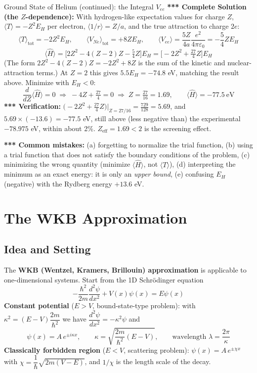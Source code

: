 \documentclass[11pt,a4paper]{article}
\begin{document}
\begin{prob}{Ground State of Helium (continued): the Integral $V_{ee}$}
\textbf{*** Complete Solution (the $Z$-dependence):} With hydrogen-like expectation values for charge $Z$, $\langle T\rangle = -Z^2E_H$ per electron, $\langle 1/r\rangle=Z/a$, and the true attraction to charge $2e$:
\[
\langle T\rangle_{\text{tot}} = -2Z^2E_H, \qquad \langle V_{Ne}\rangle_{\text{tot}} = +8ZE_H, \qquad \langle V_{ee}\rangle = \frac{5Z}{4a}\frac{e^2}{4\pi\varepsilon_0} = -\frac54ZE_H
\]
\[
\langle\hat H\rangle = \Big[2Z^2 - 4(Z-2)Z - \tfrac54Z\Big]E_H = \Big[-2Z^2+\tfrac{27}{4}Z\Big]E_H
\]
(The form $2Z^2-4(Z-2)Z=-2Z^2+8Z$ is the sum of the kinetic and nuclear-attraction terms.) At $Z=2$ this gives $5.5E_H=-74.8$ eV, matching the result above. Minimize with $E_H<0$:
\[
\frac{d}{dZ}\langle\hat H\rangle = 0 \;\Rightarrow\; -4Z+\tfrac{27}4=0 \;\Rightarrow\; \boxed{Z=\tfrac{27}{16}=1.69}, \qquad \boxed{\langle\hat H\rangle = -77.5\ \text{eV}}
\]
\textbf{*** Verification:} $\big(-2Z^2+\frac{27}4Z\big)\big|_{Z=27/16} = \frac{729}{128}=5.69$, and $5.69\times(-13.6)=-77.5$ eV, still above (less negative than) the experimental $-78.975$ eV, within about 2\%. $Z_{\text{eff}}=1.69<2$ is the screening effect.
\end{prob}

\textbf{*** Common mistakes:} (a) forgetting to normalize the trial function, (b) using a trial function that does not satisfy the boundary conditions of the problem, (c) minimizing the wrong quantity (minimize $\langle\hat H\rangle$, not $\langle T\rangle$), (d) interpreting the minimum as an exact energy: it is only an \textit{upper bound}, (e) confusing $E_H$ (negative) with the Rydberg energy $+13.6$ eV.

\section{The WKB Approximation}

\subsection{Idea and Setting}
The \textbf{WKB (Wentzel, Kramers, Brillouin) approximation} is applicable to one-dimensional systems. Start from the 1D Schr\"odinger equation
\[
-\frac{\hbar^2}{2m}\frac{d^2\psi}{dx^2} + V(x)\psi(x) = E\psi(x)
\]
\textbf{Constant potential} ($E>V$, bound-state-type problem): with $\kappa^2 = (E-V)\dfrac{2m}{\hbar^2}$ we have $\dfrac{d^2\psi}{dx^2} = -\kappa^2\psi$ and
\[
\psi(x) = A\,e^{\pm i\kappa x}, \qquad \kappa = \sqrt{\frac{2m}{\hbar^2}(E-V)}, \qquad \text{wavelength } \lambda = \frac{2\pi}{\kappa}
\]
\textbf{Classically forbidden region} ($E<V$, scattering problem): $\psi(x) = A\,e^{\pm\chi x}$ with $\chi = \dfrac1\hbar\sqrt{2m(V-E)}$, and $1/\chi$ is the length scale of the decay.
\end{document}
